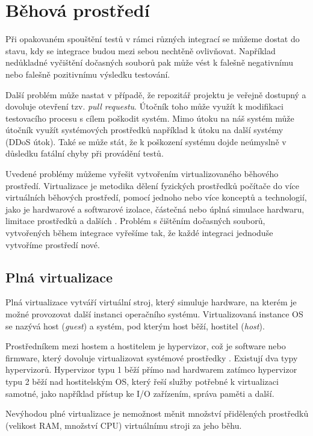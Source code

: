 \section{Běhová prostředí}

Při opakovaném spouštění testů v rámci různých integrací se můžeme dostat do stavu, kdy se integrace budou mezi sebou nechtěně ovlivňovat.
Například nedůkladné vyčištění dočasných souborů pak může vést k falešně negativnímu nebo falešně pozitivnímu výsledku testování.

Další problém může nastat v případě, že repozitář projektu je veřejně dostupný a dovoluje otevření tzv. \textit{pull requestu}.
Útočník toho může využít k modifikaci testovacího procesu s cílem poškodit systém.
Mimo útoku na náš systém může útočník využít systémových prostředků například k útoku na další systémy (DDoS útok).
Také se může stát, že k poškození systému dojde neúmyslně v důsledku fatální chyby při provádění testů.

Uvedené problémy můžeme vyřešit vytvořením virtualizovaného běhového prostředí.
Virtualizace je metodika dělení fyzických prostředků počítače do více virtuálních běhových prostředí, pomocí jednoho nebo více konceptů a technologií, jako je hardwarové a softwarové izolace, částečná nebo úplná simulace hardwaru, limitace prostředků a dalších \cite{virtualization_intro}.
Problém s čištěním dočasných souborů, vytvořených během integrace vyřešíme tak, že každé integraci jednoduše vytvoříme prostředí nové.

\subsection{Plná virtualizace}

Plná virtualizace vytváří virtuální stroj, který simuluje hardware, na kterém je možné provozovat další instanci operačního systému.
Virtualizovaná instance OS se nazývá host (\textit{guest}) a systém, pod kterým host běží, hostitel (\textit{host}).

Prostředníkem mezi hostem a hostitelem je hypervizor, což je software nebo firmware, který dovoluje virtualizovat systémové prostředky \cite{hypervisor}.
Existují dva typy hypervizorů.
Hypervizor typu 1 běží přímo nad hardwarem zatímco hypervizor typu 2 běží nad hostitelským OS, který řeší služby potřebné k virtualizaci samotné, jako například přístup ke I/O zařízením, správa paměti a další.

Nevýhodou plné virtualizace je nemožnost měnit množství přidělených prostředků (velikost RAM, množství CPU) virtuálnímu stroji za jeho běhu.

